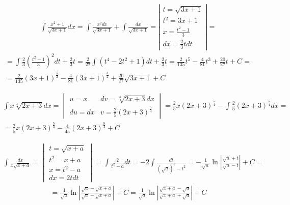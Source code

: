 
\begin{gather*}\int \frac{x^2+1}{\sqrt{3x+1}}dx = \int \frac{x^2dx}{\sqrt{3x+1}} + \int \frac{dx}{\sqrt{3x+1}} = \left| \begin{array}{l} t=\sqrt{3x+1} \\ t^2=3x+1 \\ x=\frac{t^2-1}{3} \\ dx=\frac{2}{3}tdt \end{array} \right|  = \end{gather*}
\begin{gather*}= \int \frac{2}{3} \left( \frac{t^2-1}{3} \right)^2dt + \frac{2}{3}t = \frac{2}{27} \int (t^4-2t^2+1)dt + \frac{2}{3}t = \frac{2}{135}t^5 - \frac{4}{81}t^3 + \frac{20}{27}t + C  = \\= \frac{2}{135}(3x+1)^{\frac{5}{2}} - \frac{4}{81}(3x+1)^{\frac{3}{2}} + \frac{20}{27}\sqrt{3x+1} + C\end{gather*}



\begin{gather*}\int x\sqrt[4]{2x+3}dx = \begin{vmatrix}
u=x & dv=\sqrt[4]{2x+3}dx \\
du=dx & v=\frac{2}{5}(2x+3)^{\frac{5}{4}}
\end{vmatrix} = \frac{2}{5}x(2x+3)^{\frac{5}{4}} - \int \frac{2}{5}(2x+3)^{\frac{5}{4}}dx = \\ = \frac{2}{5}x(2x+3)^{\frac{5}{4}} - \frac{4}{45}(2x+3)^{\frac{9}{4}} + C\end{gather*}



\begin{gather*}\int \frac{dx}{x\sqrt{x+a}} = \begin{vmatrix}
t=\sqrt{x+a} \\
t^2=x+a \\
x=t^2-a \\
dx=2tdt
\end{vmatrix} = \int \frac{2}{t^2-a}dt = -2 \int \frac{dt}{(\sqrt{a})^2-t^2} = -\frac{1}{\sqrt{a}}\ln \left| \frac{\sqrt{a}+t}{\sqrt{a}-t} \right| + C = \end{gather*}
\begin{gather*}= \frac{1}{\sqrt{a}}\ln \left| \frac{\sqrt{a}-\sqrt{x+a}}{\sqrt{a}+\sqrt{x+a}} \right|+C = \frac{1}{\sqrt{a}}\ln \left| \frac{\sqrt{x+a}-\sqrt{a}}{\sqrt{x+a}+\sqrt{a}} \right|+C\end{gather*}

